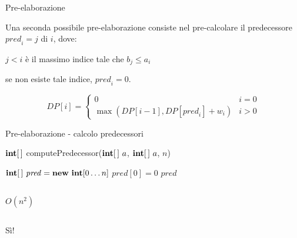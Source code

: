\begin{frame}{Pre-elaborazione}

\vspace{-6pt}
Una seconda possibile pre-elaborazione consiste nel pre-calcolare il \alert{predecessore} \alert{$\mathit{pred}_i = j$} di $i$, dove:
\BIL
\item $j<i$ è il massimo indice tale che $b_j \leq a_i$
\item se non esiste tale indice, $\mathit{pred}_i=0$.
\EIL

\begin{center}
\end{center}


\[
  DP[i] = \begin{cases}
    0 & i = 0 \\
    \max (DP[i-1], DP[\mathit{pred}_i] + w_i) & i > 0
  \end{cases}
\]

\end{frame}

\begin{frame}{Pre-elaborazione - calcolo predecessori}

\vspace{-6pt}
\begin{Procedure}
\caption[A]{$\INTEGER[\,]$ \textsf{computePredecessor($\INTEGER[\,]\ a$, $\INTEGER[\,]\ a$, \INTEGER $n$)}}    
$\INTARRAY\ \mathit{pred} = \NEW\ \INTEGER[0 \ldots n]$\;
$\mathit{pred}[0] = 0$\;
\Return $\mathit{pred}$\;
\end{Procedure}

\begin{columns}[T]
\pause
{}
\smallskip
$O(n^2)$
\end{columns}

\bigskip
\begin{columns}[T]
\pause
{}
\smallskip
Sì!
\end{columns}

\end{frame}

